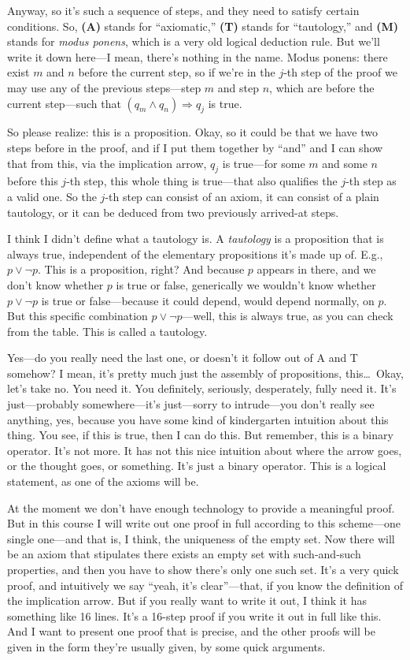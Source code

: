 Anyway, so it's such a sequence of steps, and they need to satisfy certain conditions. So, \textbf{(A)} stands for ``axiomatic,'' \textbf{(T)} stands for ``tautology,'' and \textbf{(M)} stands for \emph{modus ponens}, which is a very old logical deduction rule. But we'll write it down here---I mean, there's nothing in the name. Modus ponens: there exist $m$ and $n$ before the current step, so if we're in the $j$-th step of the proof we may use any of the previous steps---step $m$ and step $n$, which are before the current step---such that $(q_m \land q_n) \Rightarrow q_j$ is true.

So please realize: this is a proposition. Okay, so it could be that we have two steps before in the proof, and if I put them together by ``and'' and I can show that from this, via the implication arrow, $q_j$ is true---for some $m$ and some $n$ before this $j$-th step, this whole thing is true---that also qualifies the $j$-th step as a valid one. So the $j$-th step can consist of an axiom, it can consist of a plain tautology, or it can be deduced from two previously arrived-at steps.

I think I didn't define what a tautology is. A \emph{tautology} is a proposition that is always true, independent of the elementary propositions it's made up of. E.g., $p \lor \lnot p$. This is a proposition, right? And because $p$ appears in there, and we don't know whether $p$ is true or false, generically we wouldn't know whether $p \lor \lnot p$ is true or false---because it could depend, would depend normally, on $p$. But this specific combination $p \lor \lnot p$---well, this is always true, as you can check from the table. This is called a tautology.

Yes---do you really need the last one, or doesn't it follow out of A and T somehow? I mean, it's pretty much just the assembly of propositions, this\ldots\ Okay, let's take no. You need it. You definitely, seriously, desperately, fully need it. It's just---probably somewhere---it's just---sorry to intrude---you don't really see anything, yes, because you have some kind of kindergarten intuition about this thing. You see, if this is true, then I can do this. But remember, this is a binary operator. It's not more. It has not this nice intuition about where the arrow goes, or the thought goes, or something. It's just a binary operator. This is a logical statement, as one of the axioms will be.

At the moment we don't have enough technology to provide a meaningful proof. But in this course I will write out one proof in full according to this scheme---one single one---and that is, I think, the uniqueness of the empty set. Now there will be an axiom that stipulates there exists an empty set with such-and-such properties, and then you have to show there's only one such set. It's a very quick proof, and intuitively we say ``yeah, it's clear''---that, if you know the definition of the implication arrow. But if you really want to write it out, I think it has something like 16 lines. It's a 16-step proof if you write it out in full like this. And I want to present one proof that is precise, and the other proofs will be given in the form they're usually given, by some quick arguments.

